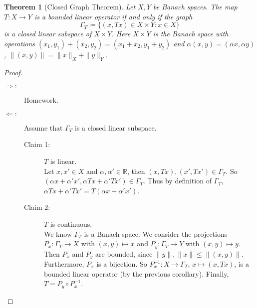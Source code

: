 \documentclass[12pt]{article}
\theoremstyle{plain}
\newtheorem{thm}{Theorem}
\theoremstyle{definition}
\begin{document}
\begin{thm}[Closed Graph Theorem]
    Let $X, Y$ be Banach spaces.
    The map $T:X\rightarrow Y$ is a bounded linear operator if and only if the graph
    \[
        \Gamma_T\coloneqq \{(x,Tx)\in X\times Y: x\in X\}
    \]
    is a closed linear subspace of $X\times Y$.
    Here $X\times Y$ is the Banach space with operations $(x_1,y_1) + (x_2, y_2) = (x_1+x_2, y_1+y_2)$ and 
    $\alpha(x,y) = (\alpha x, \alpha y)$, $\|(x,y)\| = \|x\|_X + \|y\|_Y$.
\end{thm}
\begin{proof}
    \begin{description}
        \item[$\Rightarrow: $]
            Homework.
        \item[$\Leftarrow: $]
            Assume that $\Gamma_T$ is a closed linear subspace.
            \begin{description}
                \item[Claim 1: ]$T$ is linear.\\
                    Let $x, x'\in X$ and $\alpha, \alpha'\in\mathbb{R}$, then
                    $(x, Tx), (x', Tx')\in \Gamma_T$.
                    So $(\alpha x + \alpha'x', \alpha Tx + \alpha'Tx')\in\Gamma_T$.
                    Thus by definition of $\Gamma_T$, $\alpha Tx + \alpha' Tx' = T(\alpha x+\alpha'x')$.
                \item[Claim 2: ]$T$ is continuous.\\
                    We know $\Gamma_T$ is a Banach space.
                    We consider the projections $P_x:\Gamma_T\rightarrow X$ with $(x,y)\mapsto x$
                    and $P_y:\Gamma_T\rightarrow Y$ with $(x,y)\mapsto y$.
                    Then $P_x$ and $P_y$ are bounded, since $\|y\|, \|x\| \leq \|(x,y)\|$.
                    Furthermore, $P_x$ is a bijection.
                    So $P_x^{-1} : X\rightarrow \Gamma_T$,  $x\mapsto (x, Tx)$, is a bounded linear operator (by the previous corollary).
                    Finally, $T=P_y\circ P_x^{-1}$.
            \end{description}
    \end{description}
\end{proof}
\end{document}
